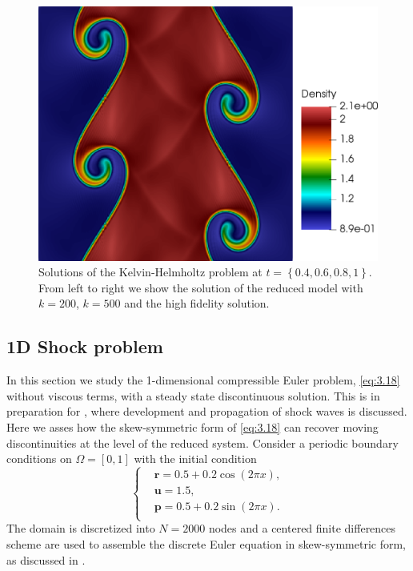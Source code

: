\begin{figure}[h!]
\includegraphics[scale=0.115]{data/Compressible_Euler/KH/Snapshots/density_exact_768.png}

\caption{Solutions of the Kelvin-Helmholtz problem at $t=\left\{ 0.4, 0.6, 0.8, 1 \right\}$. From left to right we show the solution of the reduced model with $k=200$, $k=500$ and the high fidelity solution.}
\label{fig:snap_solution_KH}
\end{figure}


\subsection{1D Shock problem}
In this section we study the 1-dimensional compressible Euler problem, \eqref{eq:3.18} without viscous terms, with a steady state discontinuous solution. This is in preparation for , where development and propagation of shock waves is discussed. Here we asses how the skew-symmetric form of \eqref{eq:3.18} can recover moving discontinuities at the level of the reduced system. Consider a periodic boundary conditions on $\Omega = [0,1]$ with the initial condition
\begin{equation*}
\begin{cases}
& \mathbf{r} = 0.5+0.2 \cos(2\pi x),\\
& \mathbf{u} = 1.5,\\
& \mathbf{p} = 0.5+0.2 \sin(2\pi x).\\
\end{cases}
\end{equation*}
The domain is discretized into $N=2000$ nodes and a centered finite differences scheme are used to assemble the discrete Euler equation in skew-symmetric form, as discussed in . 

